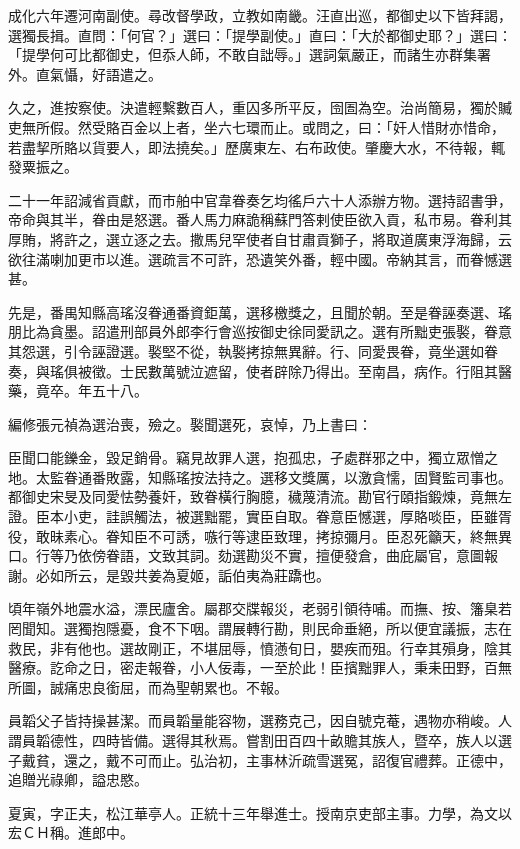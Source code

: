 \begin{pinyinscope}
成化六年遷河南副使。尋改督學政，立教如南畿。汪直出巡，都御史以下皆拜謁，選獨長揖。直問：「何官？」選曰：「提學副使。」直曰：「大於都御史耶？」選曰：「提學何可比都御史，但忝人師，不敢自詘辱。」選詞氣嚴正，而諸生亦群集署外。直氣懾，好語遣之。

久之，進按察使。決遣輕繫數百人，重囚多所平反，囹圄為空。治尚簡易，獨於贓吏無所假。然受賂百金以上者，坐六七環而止。或問之，曰：「奸人惜財亦惜命，若盡挈所賂以貨要人，即法撓矣。」歷廣東左、右布政使。肇慶大水，不待報，輒發粟振之。

二十一年詔減省貢獻，而市舶中官韋眷奏乞均徭戶六十人添辦方物。選持詔書爭，帝命與其半，眷由是怒選。番人馬力麻詭稱蘇門答剌使臣欲入貢，私市易。眷利其厚賄，將許之，選立逐之去。撒馬兒罕使者自甘肅貢獅子，將取道廣東浮海歸，云欲往滿喇加更市以進。選疏言不可許，恐遺笑外番，輕中國。帝納其言，而眷憾選甚。

先是，番禺知縣高瑤沒眷通番資鉅萬，選移檄獎之，且聞於朝。至是眷誣奏選、瑤朋比為貪墨。詔遣刑部員外郎李行會巡按御史徐同愛訊之。選有所黜吏張褧，眷意其怨選，引令誣證選。褧堅不從，執褧拷掠無異辭。行、同愛畏眷，竟坐選如眷奏，與瑤俱被徵。士民數萬號泣遮留，使者辟除乃得出。至南昌，病作。行阻其醫藥，竟卒。年五十八。

編修張元禎為選治喪，殮之。褧聞選死，哀悼，乃上書曰：

臣聞口能鑠金，毀足銷骨。竊見故罪人選，抱孤忠，孑處群邪之中，獨立眾憎之地。太監眷通番敗露，知縣瑤按法持之。選移文獎厲，以激貪懦，固賢監司事也。都御史宋旻及同愛怯勢養奸，致眷橫行胸臆，穢蔑清流。勘官行頤指鍛煉，竟無左證。臣本小吏，詿誤觸法，被選黜罷，實臣自取。眷意臣憾選，厚賂啖臣，臣雖胥役，敢昧素心。眷知臣不可誘，嗾行等逮臣致理，拷掠彌月。臣忍死籲天，終無異口。行等乃依傍眷語，文致其詞。劾選勘災不實，擅便發倉，曲庇屬官，意圖報謝。必如所云，是毀共姜為夏姬，詬伯夷為莊蹻也。

頃年嶺外地震水溢，漂民廬舍。屬郡交牒報災，老弱引領待哺。而撫、按、籓臬若罔聞知。選獨抱隱憂，食不下咽。謂展轉行勘，則民命垂絕，所以便宜議振，志在救民，非有他也。選故剛正，不堪屈辱，憤懣旬日，嬰疾而殂。行幸其殞身，陰其醫療。訖命之日，密走報眷，小人佞毒，一至於此！臣擯黜罪人，秉耒田野，百無所圖，誠痛忠良銜屈，而為聖朝累也。不報。

員韜父子皆持操甚潔。而員韜量能容物，選務克己，因自號克菴，遇物亦稍峻。人謂員韜德性，四時皆備。選得其秋焉。嘗割田百四十畝贍其族人，暨卒，族人以選子戴貧，還之，戴不可而止。弘治初，主事林沂疏雪選冤，詔復官禮葬。正德中，追贈光祿卿，謚忠愍。

夏寅，字正夫，松江華亭人。正統十三年舉進士。授南京吏部主事。力學，為文以宏ＣＨ稱。進郎中。


\end{pinyinscope}
